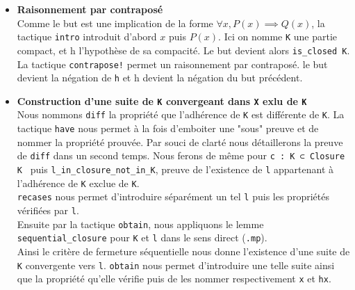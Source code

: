 \documentclass[a4paper, 12pt]{article}
\newcommand{\lean}[1]{\texttt{#1}}
\begin{document}
\begin{itemize}[itemsep=30pt]


    \item \textbf{Raisonnement par contraposé}\\
    Comme le but est une implication de la forme $ \forall x, P(x) \implies Q(x)$, la tactique \lean{intro} introduit d'abord $x$ puis $P(x)$. Ici on nomme \lean{K} une partie compact,
    et h l'hypothèse de sa compacité. Le but devient alors \lean{is_closed K}.\\
    La tactique \lean{contrapose!} permet un raisonnement par contraposé. le but devient la négation de \lean{h} et h devient la négation du but précédent.


    \item \textbf{Construction d'une suite de \lean{K} convergeant dans \lean{X} exlu de \lean{K} }\\
    Nous nommons \lean{diff} la propriété que l'adhérence de \lean{K} est différente de \lean{K}. La tactique \lean{have} nous permet à la fois d'emboiter une "sous" preuve et de nommer
    la propriété prouvée. Par souci de clarté nous détaillerons la preuve de \lean{diff} dans un second temps. Nous ferons de même pour \lean{c : K ⊂ Closure K } puis
    \lean{l_in_closure_not_in_K}, preuve de l'existence de \lean{l} appartenant à l'adhérence de \lean{K} exclue de \lean{K}.\\
    \lean{recases} nous permet d'introduire séparément un tel \lean{l} puis les propriétés vérifiées par \lean{l}.\\
    Ensuite par la tactique \lean{obtain}, nous appliquons le lemme \lean{sequential_closure} pour \lean{K} et \lean{l} dans le sens direct (\lean{.mp}).\\
    Ainsi le critère de fermeture séquentielle nous donne l'existence d'une suite de \lean{K} convergente vers \lean{l}. \lean{obtain} nous permet d'introduire une telle suite ainsi que
    la propriété qu'elle vérifie puis de les nommer respectivement \lean{x} et \lean{hx}.



\end{itemize}
\end{document}
